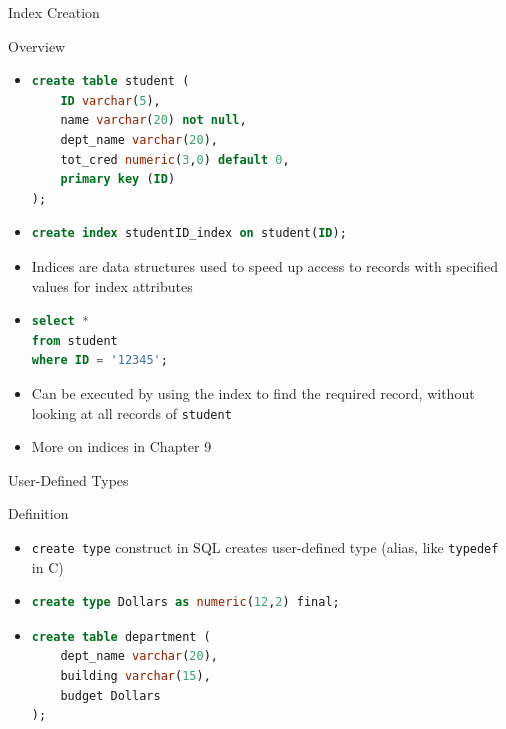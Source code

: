 \documentclass[aspectratio=169, xcolor=dvipsnames]{beamer}
\begin{document}
\begin{frame}[fragile]{Index Creation}
    \begin{block}{Overview}
        \begin{itemize}[<+->]
            \item \begin{lstlisting}[language=SQL, basicstyle=\ttfamily\scriptsize]
create table student ( 
    ID varchar(5), 
    name varchar(20) not null, 
    dept_name varchar(20), 
    tot_cred numeric(3,0) default 0, 
    primary key (ID)
);
            \end{lstlisting}
            \item \begin{lstlisting}[language=SQL, basicstyle=\ttfamily\scriptsize]
create index studentID_index on student(ID);
            \end{lstlisting}
            \item Indices are data structures used to speed up access to records with specified values for index attributes
            \item \begin{lstlisting}[language=SQL, basicstyle=\ttfamily\scriptsize]
select * 
from student 
where ID = '12345';
            \end{lstlisting}
            \item Can be executed by using the index to find the required record, without looking at all records of \texttt{student}
            \item More on indices in Chapter 9
        \end{itemize}
    \end{block}
\end{frame}

\begin{frame}[fragile]{User-Defined Types}
    \begin{block}{Definition}
        \begin{itemize}[<+->]
            \item \texttt{create type} construct in SQL creates user-defined type (alias, like \texttt{typedef} in C)
            \item \begin{lstlisting}[language=SQL]
create type Dollars as numeric(12,2) final;
            \end{lstlisting}
            \item \begin{lstlisting}[language=SQL]
create table department (
    dept_name varchar(20), 
    building varchar(15), 
    budget Dollars 
);
            \end{lstlisting}
        \end{itemize}
    \end{block}
\end{frame}
\end{document}
